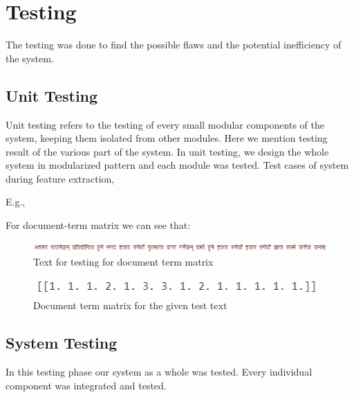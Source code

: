 \documentclass[12pt]{report}
\begin{document}
        \section{Testing}
        The testing was done to find the possible flaws and the potential inefficiency of the system.

        \subsection{Unit Testing}
        Unit testing refers to the testing of every small modular components of the system, keeping them isolated from other modules.
        Here we mention testing result of the various part of the system. In unit testing, we design the whole system in modularized pattern and 
        each module was tested. 
        Test cases of system during feature extraction,

        E.g.,

            For document-term matrix we can see that: 
            \begin{figure}[h]
                \centering
                \includegraphics[scale=0.7]{testText.jpg}
                \caption{Text for testing for document term matrix}
            \end{figure}
            \begin{figure}[h]
                \centering
                \includegraphics{docTerm.jpg}
                \caption{ Document term matrix for the given test text}
            \end{figure}


        \subsection{System Testing}
        In this testing phase our system as a whole was tested. Every individual component was integrated and tested.
\end{document}
